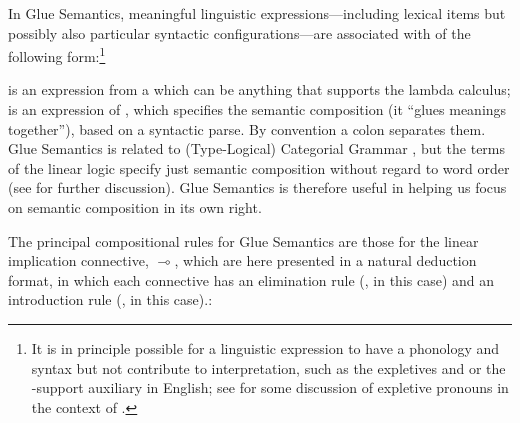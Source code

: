 In Glue Semantics, meaningful
linguistic expressions---including lexical items but possibly also
particular syntactic configurations---are associated
with  of the following form:\footnote{It is
in principle possible for a linguistic expression to have a phonology
and syntax but not contribute to interpretation, such as the expletives  and  or the -support
auxiliary in English; see \citet[113]{asudeh-lpr} for some discussion of
expletive pronouns in the context of \glue.}
\begin{exe}
\ex {}
\end{exe}
%
 is an expression from a 
which can be anything that supports the lambda calculus;  is an
expression of  \citep{girard87}, which 
specifies the semantic composition (it ``glues meanings
together''), based on a syntactic parse.  By convention a colon separates them. Glue Semantics is related to (Type-Logical) Categorial
Grammar \citep{carpenter97,morrill94a,morrill11,moortgat97}, but 
the terms of the linear logic specify just semantic
composition without regard to word order 
(see \citealt{asudeh-lpr} for further discussion). Glue Semantics is
therefore useful in helping us focus on semantic composition in its
own right.

The principal compositional rules for Glue Semantics are those for the
linear implication connective, $\multimap$, which are here presented in a
natural deduction format, in which each connective has an elimination rule (\formula{\linimpE}, in this case) and an introduction rule (\formula{\linimpI}, in this case).:
%
%  
%
  
